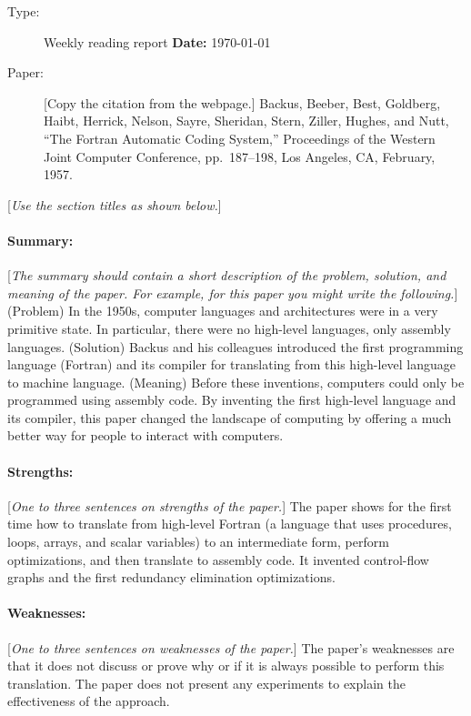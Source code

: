 \documentclass[12pt]{article}
\begin{document}
\thispagestyle{empty}

\begin{description}
\item[Type:] Weekly reading report  \hfill {\bf Date:} \today
\item[Paper:] [Copy the citation from the webpage.] Backus, Beeber, Best,
  Goldberg, Haibt, Herrick, Nelson, Sayre, Sheridan, Stern, Ziller, Hughes,
  and Nutt, ``The Fortran Automatic Coding System,'' Proceedings of the Western
  Joint Computer Conference, pp.\ 187--198, Los Angeles, CA, February, 1957.
\end{description}
[\emph{Use the section titles as shown below.}]

\paragraph{Summary:} [\emph{The summary should contain a short description of
  the problem, solution, and meaning of the paper. For example, for
  this paper you might write the following.}] \\
(Problem) In the 1950s, computer languages and architectures were in a very
primitive state. In particular, there were no high-level languages, only
assembly languages. (Solution) Backus and his colleagues introduced the first
programming language (Fortran) and its compiler for translating from this
high-level language to machine language.  (Meaning) Before these inventions,
computers could only be programmed using assembly code.  By inventing the
first high-level language and its compiler, this paper changed the landscape
of computing by offering a much better way for people to interact with
computers.

\paragraph{Strengths:} [\emph{One to three sentences on strengths of the paper.}]
The paper shows for the first time how to translate from high-level Fortran (a
language that uses procedures, loops, arrays, and scalar variables) to an
intermediate form, perform optimizations, and then translate to assembly
code. It invented control-flow graphs and the first redundancy elimination
optimizations.

\paragraph{Weaknesses:} [\emph{One to three sentences on weaknesses of the
  paper.}]
The paper's weaknesses are that it does not discuss or prove why or if it is
always possible to perform this translation.  The paper does not present any
experiments to explain the effectiveness of the approach.
\end{document}
